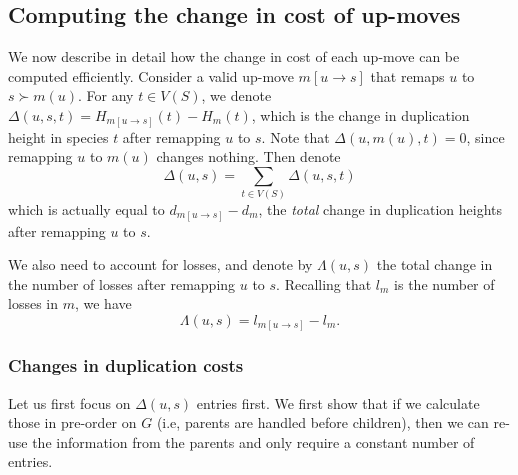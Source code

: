 \documentclass[10pt]{article}
\begin{document}
\subsection{Computing the change in cost of up-moves}

We now describe in detail how the change in cost of each up-move can be computed efficiently.  
Consider a valid up-move $m[u \rightarrow s]$ that remaps $u$ to $s \succ m(u)$. 
For any $t \in V(S)$, 
we denote $\Delta(u, s, t) = H_{m[u \rightarrow s]}(t) - H_m(t)$, which is the change in duplication height in species $t$ after remapping $u$ to $s$. 
Note that $\Delta(u, m(u), t) = 0$, since remapping $u$ to $m(u)$ changes nothing.
Then denote
\[
\Delta(u, s) = \sum_{t \in V(S)} \Delta(u, s, t)
\]
which is actually equal to $d_{m[u \rightarrow s]} - d_m$, the \emph{total} change in duplication heights after remapping $u$ to $s$. 

We also need to account for losses, and denote by $\Lambda(u, s)$ the total change in the number of losses after remapping $u$ to $s$.  Recalling that $l_m$ is the number of losses in $m$, we have
\[
\Lambda(u, s) = l_{m[u \rightarrow s]} - l_m.
\]





\subsubsection{Changes in duplication costs}

Let us first focus on $\Delta(u, s)$ entries first.
We first show that if we calculate those in pre-order on $G$ (i.e, parents are handled before children), then we can re-use the information from the parents and only require a constant number of entries.  
\end{document}
